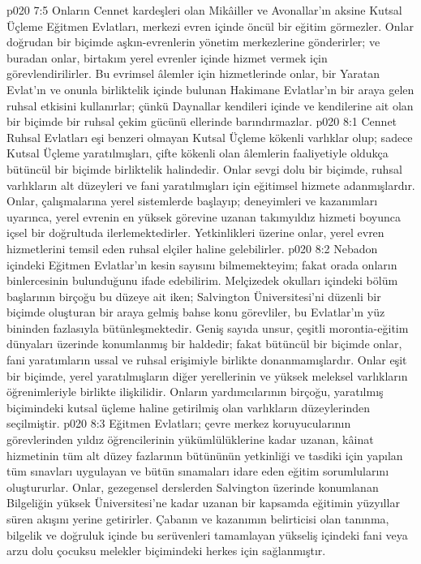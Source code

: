 \vs p020 7:5 Onların Cennet kardeşleri olan Mikâiller ve Avonallar’ın aksine Kutsal Üçleme Eğitmen Evlatları, merkezi evren içinde öncül bir eğitim görmezler. Onlar doğrudan bir biçimde aşkın\hyp{}evrenlerin yönetim merkezlerine gönderirler; ve buradan onlar, birtakım yerel evrenler içinde hizmet vermek için görevlendirilirler. Bu evrimsel âlemler için hizmetlerinde onlar, bir Yaratan Evlat’ın ve onunla birliktelik içinde bulunan Hakimane Evlatlar’ın bir araya gelen ruhsal etkisini kullanırlar; çünkü Daynallar kendileri içinde ve kendilerine ait olan bir biçimde bir ruhsal çekim gücünü ellerinde barındırmazlar.
\vs p020 8:1 Cennet Ruhsal Evlatları eşi benzeri olmayan Kutsal Üçleme kökenli varlıklar olup; sadece Kutsal Üçleme yaratılmışları, çifte kökenli olan âlemlerin faaliyetiyle oldukça bütüncül bir biçimde birliktelik halindedir. Onlar sevgi dolu bir biçimde, ruhsal varlıkların alt düzeyleri ve fani yaratılmışları için eğitimsel hizmete adanmışlardır. Onlar, çalışmalarına yerel sistemlerde başlayıp; deneyimleri ve kazanımları uyarınca, yerel evrenin en yüksek görevine uzanan takımyıldız hizmeti boyunca içsel bir doğrultuda ilerlemektedirler. Yetkinlikleri üzerine onlar, yerel evren hizmetlerini temsil eden ruhsal elçiler haline gelebilirler.
\vs p020 8:2 Nebadon içindeki Eğitmen Evlatlar’ın kesin sayısını bilmemekteyim; fakat orada onların binlercesinin bulunduğunu ifade edebilirim. Melçizedek okulları içindeki bölüm başlarının birçoğu bu düzeye ait iken; Salvington Üniversitesi’ni düzenli bir biçimde oluşturan bir araya gelmiş bahse konu görevliler, bu Evlatlar’ın yüz bininden fazlasıyla bütünleşmektedir. Geniş sayıda unsur, çeşitli morontia\hyp{}eğitim dünyaları üzerinde konumlanmış bir haldedir; fakat bütüncül bir biçimde onlar, fani yaratımların ussal ve ruhsal erişimiyle birlikte donanmamışlardır. Onlar eşit bir biçimde, yerel yaratılmışların diğer yerellerinin ve yüksek meleksel varlıkların öğrenimleriyle birlikte ilişkilidir. Onların yardımcılarının birçoğu, yaratılmış biçimindeki kutsal üçleme haline getirilmiş olan varlıkların düzeylerinden seçilmiştir.
\vs p020 8:3 Eğitmen Evlatları; çevre merkez koruyucularının görevlerinden yıldız öğrencilerinin yükümlülüklerine kadar uzanan, kâinat hizmetinin tüm alt düzey fazlarının bütününün yetkinliği ve tasdiki için yapılan tüm sınavları uygulayan ve bütün sınamaları idare eden eğitim sorumlularını oluştururlar. Onlar, gezegensel derslerden Salvington üzerinde konumlanan Bilgeliğin yüksek Üniversitesi’ne kadar uzanan bir kapsamda eğitimin yüzyıllar süren akışını yerine getirirler. Çabanın ve kazanımın belirticisi olan tanınma, bilgelik ve doğruluk içinde bu serüvenleri tamamlayan yükseliş içindeki fani veya arzu dolu çocuksu melekler biçimindeki herkes için sağlanmıştır.
